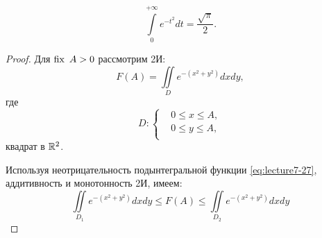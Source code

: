 \begin{theorem}
	\begin{equation}
		\label{eq:lecture7-26}
		\boxed{\int\limits_{0}^{+\infty}e^{-t^2}dt = \dfrac{\sqrt{\pi}}{2}.}
	\end{equation}
\end{theorem}
\begin{proof}
	Для $\operatorname{\text{fix }} A > 0$ рассмотрим 2И:
	\begin{equation}
		\label{eq:lecture7-27}
		F(A) = \iint\limits_De^{-(x^2 + y^2)}dxdy,
	\end{equation}
	где
	\begin{equation*}
		D :
		\begin{cases}
			&0 \leqslant x \leqslant A,\\
			&0 \leqslant y \leqslant A,\\
		\end{cases}
	\end{equation*}
	квадрат в $\mathbb{R}^{2}$.

	Используя неотрицательность подынтегральной функции \eqref{eq:lecture7-27}, аддитивность и монотонность 2И, имеем:
	\begin{equation}
		\label{eq:lecture7-28}
		\iint\limits_{D_1}e^{-(x^2 + y^2)}dxdy \leqslant F(A) \leqslant
		\iint\limits_{D_2}e^{-(x^2 + y^2)}dxdy
	\end{equation}


\end{proof}
